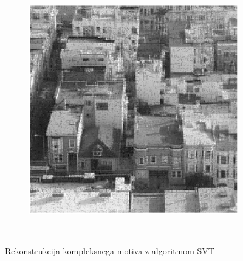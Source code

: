 \begin{figure}
\begin{subfigure}{0.325\linewidth}
    \end{subfigure}
    \hfill
    \begin{subfigure}{0.325\linewidth}
        \includegraphics[width=\linewidth]{Poglavja/Slike/kompleksna grayscale 300/rez60SVT.png}
    \end{subfigure}\\[-1cm]
    \caption{Rekonstrukcija kompleksnega motiva z algoritmom SVT}
    \vspace{0.5cm}
\end{figure}

